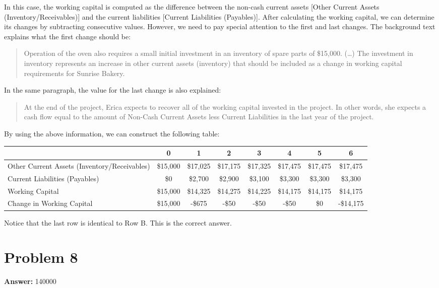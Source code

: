 \documentclass[11pt]{article}
\begin{document}
In this case, the working capital is computed as the difference between the
non-cash current assets [Other Current Assets (Inventory/Receivables)] and the
current liabilities [Current Liabilities (Payables)]. After calculating the
working capital, we can determine its changes by subtracting consecutive values.
However, we need to pay special attention to the first and last changes. The
background text explains what the first change should be:
\begin{quote}
Operation of the oven also requires a small initial investment in an inventory
of spare parts of \$15,000. (\ldots{}) The investment in inventory represents an
increase in other current assets (inventory) that should be included as a change
in working capital requirements for Sunrise Bakery.
\end{quote}
In the same paragraph, the value for the last change is also explained:
\begin{quote}
At the end of the project, Erica expects to recover all of the working capital
invested in the project. In other words, she expects a cash flow equal to the
amount of Non-Cash Current Assets less Current Liabilities in the last year of
the project.
\end{quote}
By using the above information, we can construct the following table:
{\small
\begin{center}
\begin{tabular}{|l|c|c|c|c|c|c|c|}
\hline
 & 0 & 1 & 2 & 3 & 4 & 5 & 6\\
\hline
Other Current Assets (Inventory/Receivables) & \$15,000 & \$17,025 & \$17,175 & \$17,325 & \$17,475 & \$17,475 & \$17,475\\
Current Liabilities (Payables) & \$0 & \$2,700 & \$2,900 & \$3,100 & \$3,300 & \$3,300 & \$3,300\\
Working Capital & \$15,000 & \$14,325 & \$14,275 & \$14,225 & \$14,175 & \$14,175 & \$14,175\\
Change in Working Capital & \$15,000 & -\$675 & -\$50 & -\$50 & -\$50 & \$0 & -\$14,175\\
\hline
\end{tabular}
\end{center}
}
Notice that the last row is identical to Row B. This is the correct answer.
\section*{Problem 8}
\label{sec:org32a4b92}

\textbf{Answer:} 140000\\
\end{document}
